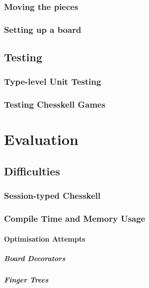 \documentclass[12pt, a4paper, bibliography=totocnumbered]{scrreprt}
\begin{document}
\section{Moving the pieces}

\section{Setting up a board}

\chapter{Testing}

\section{Type-level Unit Testing}

\section{Testing Chesskell Games}


\part{Evaluation}

\chapter{Difficulties}

\section{Session-typed Chesskell}

\section{Compile Time and Memory Usage}

\subsection{Optimisation Attempts}

\subsubsection{Board Decorators}

\subsubsection{Finger Trees}
\end{document}
